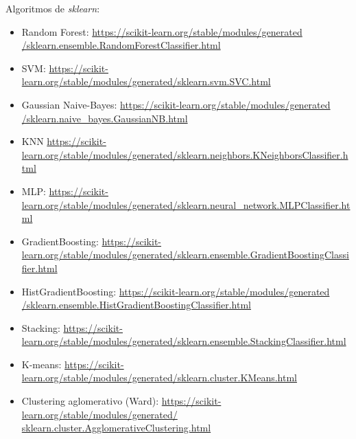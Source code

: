 \documentclass{article}
\begin{document}
Algoritmos de \textit{sklearn}:
\begin{itemize}

\item Random Forest: \href{https://scikit-learn.org/stable/modules/generated/sklearn.ensemble.RandomForestClassifier.html}{https://scikit-learn.org/stable/modules/generated\\/sklearn.ensemble.RandomForestClassifier.html}
\item SVM: \href{https://scikit-learn.org/stable/modules/generated/sklearn.svm.SVC.html}{https://scikit-learn.org/stable/modules/generated/sklearn.svm.SVC.html}
\item Gaussian Naive-Bayes: \href{https://scikit-learn.org/stable/modules/generated/sklearn.naive_bayes.GaussianNB.html}{https://scikit-learn.org/stable/modules/generated\\/sklearn.naive\_bayes.GaussianNB.html}
\item KNN \href{https://scikit-learn.org/stable/modules/generated/sklearn.neighbors.KNeighborsClassifier.html}{https://scikit-learn.org/stable/modules/generated/sklearn.neighbors.KNeighborsClassifier.html}
\item MLP: \href{https://scikit-learn.org/stable/modules/generated/sklearn.neural_network.MLPClassifier.html}{https://scikit-learn.org/stable/modules/generated/sklearn.neural\_network.MLPClassifier.html}
\item GradientBoosting: \href{https://scikit-learn.org/stable/modules/generated/sklearn.ensemble.GradientBoostingClassifier.html}{https://scikit-learn.org/stable/modules/generated/sklearn.ensemble.GradientBoostingClassifier.html}
\item HistGradientBoosting: \href{https://scikit-learn.org/stable/modules/generated/sklearn.ensemble.HistGradientBoostingClassifier.html}{https://scikit-learn.org/stable/modules/generated\\/sklearn.ensemble.HistGradientBoostingClassifier.html}
\item Stacking: \href{https://scikit-learn.org/stable/modules/generated/sklearn.ensemble.StackingClassifier.html}{https://scikit-learn.org/stable/modules/generated/sklearn.ensemble.StackingClassifier.html}
\item K-means: \href{https://scikit-learn.org/stable/modules/generated/sklearn.cluster.KMeans.html}{https://scikit-learn.org/stable/modules/generated/sklearn.cluster.KMeans.html}
\item Clustering aglomerativo (Ward):
  \href{https://scikit-learn.org/stable/modules/generated/sklearn.cluster.AgglomerativeClustering.html}{https://scikit-learn.org/stable/modules/generated/\\sklearn.cluster.AgglomerativeClustering.html}
\end{itemize}
\end{document}
